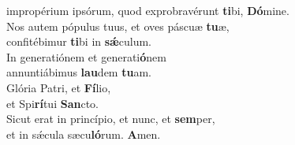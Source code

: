 \oddverse impropérium ipsórum, quod exprobravérunt \textbf{ti}bi, \textbf{Dó}mine.\\
\evenverse Nos autem pópulus tuus, et oves páscuæ \textbf{tu}æ,~\*\\
\evenverse confitébimur \textbf{ti}bi in \textbf{sǽ}culum.\\
\oddverse In generatiónem et generati\textbf{ó}nem~\*\\
\oddverse annuntiábimus \textbf{lau}dem \textbf{tu}am.\\
\evenverse Glória Patri, et \textbf{Fí}lio,~\*\\
\evenverse et Spi\textbf{rí}tui \textbf{San}cto.\\
\oddverse Sicut erat in princípio, et nunc, et \textbf{sem}per,~\*\\
\oddverse et in sǽcula sæcu\textbf{ló}rum. \textbf{A}men.\\
